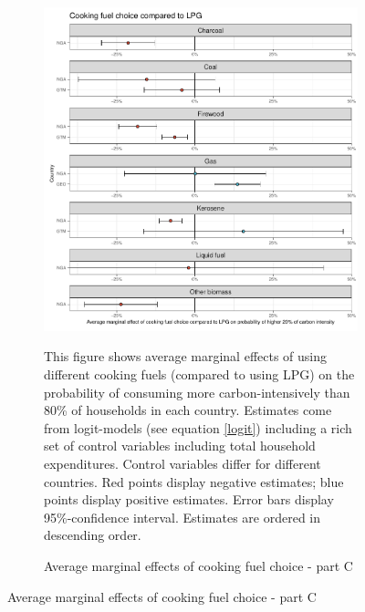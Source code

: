  \begin{figure}[ht!]\ContinuedFloat
   \centering
   \begin{subfigure}[b]{\textwidth}
   \centering
   \includegraphics{1_Figures/Analysis_Logit_Models_Marginal_Effects/Average_Marginal_Effects_affected_upper_80_CF_LPG_2017B.pdf}
   \caption{Average marginal effects of cooking fuel choice - part C} \label{fig:Logit_ME_CF_3}
   \begin{subcaption2}
     This figure shows average marginal effects of using different cooking fuels (compared to using LPG) on the probability of consuming more carbon-intensively than 80\% of households in each country. Estimates come from logit-models (see equation \ref{logit}) including a rich set of control variables including total household expenditures. Control variables differ for different countries. Red points display negative estimates; blue points display positive estimates. Error bars display 95\%-confidence interval. Estimates are ordered in descending order.
   \end{subcaption2}
   \end{subfigure}
 \end{figure}
 \clearpage

